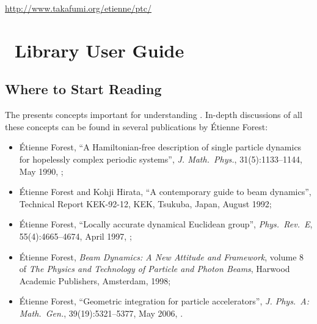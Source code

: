 \url{http://www.takafumi.org/etienne/ptc/}

%


\section{\PTC\ Library User Guide}

%
%
%
%

\subsection{Where to Start Reading}

The  presents concepts important for understanding \PTC.
In-depth discussions of all these concepts can be found in several
publications by \'Etienne Forest:
\begin{itemize}
  \item \'Etienne Forest,
``A Hamiltonian-free description of single particle dynamics for
hopelessly complex periodic systems'',
\emph{J. Math.\ Phys.}, 31(5):1133--1144, May 1990,
;

  \item \'Etienne Forest and Kohji Hirata,
``A contemporary guide to beam dynamics'',
Technical Report KEK-92-12, KEK, Tsukuba, Japan, August 1992;

  \item \'Etienne Forest,
``Locally accurate dynamical Euclidean group'',
\emph{Phys.\ Rev.\ E}, 55(4):4665--4674, April 1997,
;

  \item \'Etienne Forest,
\emph{Beam Dynamics: A New Attitude and Framework},
volume 8 of
\emph{The Physics and Technology of Particle and Photon Beams},
Harwood Academic Publishers, Amsterdam, 1998;

  \item \'Etienne Forest,
``Geometric integration for particle accelerators'',
\emph{J. Phys.\ A: Math.\ Gen.}, 39(19):5321--5377, May 2006,
.
\end{itemize}

